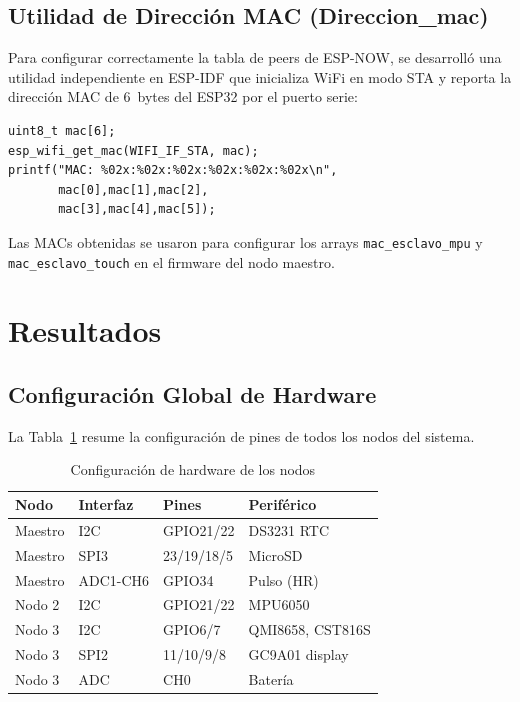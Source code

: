 \documentclass[10pt,twocolumn,a4paper]{article}
\begin{document}
\subsection{Utilidad de Dirección MAC (Direccion\_mac)}

Para configurar correctamente la tabla de peers de ESP-NOW, se desarrolló
una utilidad independiente en ESP-IDF que inicializa WiFi en modo STA y
reporta la dirección MAC de 6~bytes del ESP32 por el puerto serie:

\begin{lstlisting}[style=csrc, numbers=none,
  caption={Lectura de MAC WiFi en ESP-IDF},
  label=lst:mac]
uint8_t mac[6];
esp_wifi_get_mac(WIFI_IF_STA, mac);
printf("MAC: %02x:%02x:%02x:%02x:%02x:%02x\n",
       mac[0],mac[1],mac[2],
       mac[3],mac[4],mac[5]);
\end{lstlisting}

Las MACs obtenidas se usaron para configurar los arrays
\texttt{mac\_esclavo\_mpu} y \texttt{mac\_esclavo\_touch} en el
firmware del nodo maestro.

\section{Resultados}
\label{sec:res}

\subsection{Configuración Global de Hardware}

La Tabla~\ref{tab:hw} resume la configuración de pines de todos los
nodos del sistema.

\begin{table}[H]
\centering
\caption{Configuración de hardware de los nodos}
\label{tab:hw}
\scriptsize
\begin{tabular}{p{1.2cm}p{1.4cm}p{1.4cm}p{1.6cm}}
\toprule
\textbf{Nodo} & \textbf{Interfaz} & \textbf{Pines} & \textbf{Periférico} \\
\midrule
Maestro & I2C & GPIO21/22 & DS3231 RTC \\
Maestro & SPI3 & 23/19/18/5 & MicroSD \\
Maestro & ADC1-CH6 & GPIO34 & Pulso (HR) \\
Nodo 2 & I2C & GPIO21/22 & MPU6050 \\
Nodo 3 & I2C & GPIO6/7 & QMI8658, CST816S \\
Nodo 3 & SPI2 & 11/10/9/8 & GC9A01 display \\
Nodo 3 & ADC & CH0 & Batería \\
\bottomrule
\end{tabular}
\end{table}
\end{document}
